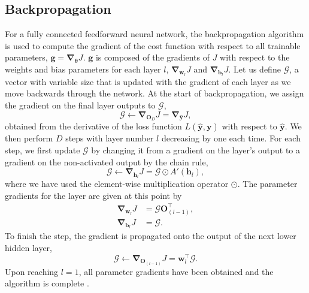 \documentclass[12pt]{article}
\begin{document}
\subsection{Backpropagation}
For a fully connected feedforward neural network, the backpropagation algorithm is used to compute the gradient of the cost function with respect to all trainable parameters, $\bm{g}=\bm\nabla_{\bm\theta}J$. $\bm{g}$ is composed of the gradients of $J$ with respect to the weights and bias parameters for each layer $l$, $\bm\nabla_{\bm{w}_l}J$ and $\bm\nabla_{\bm{b}_l}J$. Let us define $\bm{\mathcal{G}}$, a vector with variable size that is updated with the gradient of each layer as we move backwards through the network. At the start of backpropagation, we assign the gradient on the final layer outputs to $\bm{\mathcal{G}}$,
\begin{equation}
\bm{\mathcal{G}}\leftarrow \bm\nabla_{\bm{O}_D}J=\bm\nabla_{\hat{\bm{y}}}J, 
\end{equation} 
obtained from the derivative of the loss function $L(\hat{\bm{y}},\bm{y})$ with respect to $\hat{\bm{y}}$. We then perform $D$ steps with layer number $l$ decreasing by one each time. For each step, we first update $\bm{\mathcal{G}}$ by changing it from a gradient on the layer's output to a gradient on the non-activated output by the chain rule,
\begin{equation}
\bm{\mathcal{G}}\leftarrow \bm{\nabla}_{\bm{h}_l}J=\bm{\mathcal{G}}\odot A'(\bm{h}_l),
\end{equation}
where we have used the element-wise multiplication operator $\odot$. The parameter gradients for the layer are given at this point by
\begin{align}
\bm\nabla_{\bm{w}_l}J&=\bm{\mathcal{G}}\bm{O}_{(l-1)}^{\top},\\
\bm\nabla_{\bm{b}_l}J&=\bm{\mathcal{G}}.
\end{align}
To finish the step, the gradient is propagated onto the output of the next lower hidden layer,
\begin{equation}
\bm{\mathcal{G}}\leftarrow \bm{\nabla}_{\bm{O}_{(l-1)}}J=\bm{w}_l^{\top}\bm{\mathcal{G}}.
\end{equation}
Upon reaching $l=1$, all parameter gradients have been obtained and the algorithm is complete \cite{Rumelhart86, Goodfellow16}.
\end{document}
